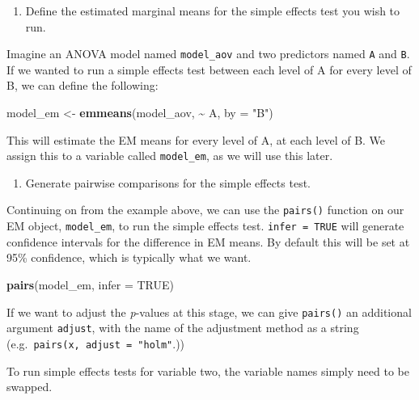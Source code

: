 \documentclass[
]{book}
\newenvironment{Shaded}{\begin{snugshade}}{\end{snugshade}}
\newcommand{\AttributeTok}[1]{\textcolor[rgb]{0.13,0.29,0.53}{#1}}
\newcommand{\ConstantTok}[1]{\textcolor[rgb]{0.56,0.35,0.01}{#1}}
\newcommand{\FunctionTok}[1]{\textcolor[rgb]{0.13,0.29,0.53}{\textbf{#1}}}
\newcommand{\NormalTok}[1]{#1}
\newcommand{\OtherTok}[1]{\textcolor[rgb]{0.56,0.35,0.01}{#1}}
\newcommand{\SpecialCharTok}[1]{\textcolor[rgb]{0.81,0.36,0.00}{\textbf{#1}}}
\newcommand{\StringTok}[1]{\textcolor[rgb]{0.31,0.60,0.02}{#1}}
\providecommand{\tightlist}{%
  \setlength{\itemsep}{0pt}\setlength{\parskip}{0pt}}
\begin{document}
\begin{enumerate}
\def\labelenumi{\arabic{enumi}.}
\tightlist
\item
  Define the estimated marginal means for the simple effects test you wish to run.
\end{enumerate}

Imagine an ANOVA model named \texttt{model\_aov} and two predictors named \texttt{A} and \texttt{B}. If we wanted to run a simple effects test between each level of A for every level of B, we can define the following:

\begin{Shaded}
\begin{Highlighting}[]
\NormalTok{model\_em }\OtherTok{\textless{}{-}} \FunctionTok{emmeans}\NormalTok{(model\_aov, }\SpecialCharTok{\textasciitilde{}}\NormalTok{ A, }\AttributeTok{by =} \StringTok{"B"}\NormalTok{)}
\end{Highlighting}
\end{Shaded}

This will estimate the EM means for every level of A, at each level of B. We assign this to a variable called \texttt{model\_em}, as we will use this later.

\begin{enumerate}
\def\labelenumi{\arabic{enumi}.}
\setcounter{enumi}{1}
\tightlist
\item
  Generate pairwise comparisons for the simple effects test.
\end{enumerate}

Continuing on from the example above, we can use the \texttt{pairs()} function on our EM object, \texttt{model\_em}, to run the simple effects test. \texttt{infer\ =\ TRUE} will generate confidence intervals for the difference in EM means. By default this will be set at 95\% confidence, which is typically what we want.

\begin{Shaded}
\begin{Highlighting}[]
\FunctionTok{pairs}\NormalTok{(model\_em, }\AttributeTok{infer =} \ConstantTok{TRUE}\NormalTok{)}
\end{Highlighting}
\end{Shaded}

If we want to adjust the \emph{p}-values at this stage, we can give \texttt{pairs()} an additional argument \texttt{adjust}, with the name of the adjustment method as a string (e.g.~\texttt{pairs(x,\ adjust\ =\ "holm"}.))

To run simple effects tests for variable two, the variable names simply need to be swapped.
\end{document}
